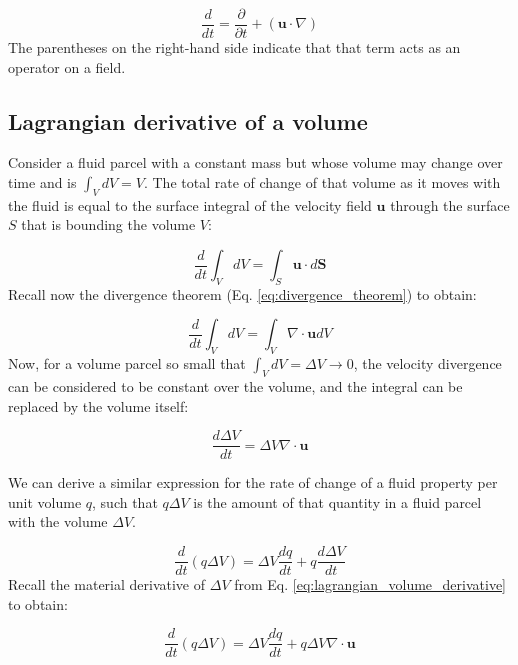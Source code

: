 \documentclass[12pt]{article}
\numberwithin{equation}{section}
\numberwithin{figure}{section}
\numberwithin{table}{section}
\begin{document}
\begin{equation}
  \frac{d}{dt} = \frac{\partial}{\partial t} + (\mathbf{u} \cdot \nabla)
\end{equation}
The parentheses on the right-hand side indicate that that term acts as an
operator on a field.

\subsection{Lagrangian derivative of a volume}

Consider a fluid parcel with a constant mass but whose volume may change over
time and is $\int_V dV = V$.
The total rate of change of that volume as it moves with the fluid is equal to
the surface integral of the velocity field $\mathbf{u}$ through the surface
$S$ that is bounding the volume $V$:

\begin{equation}
  \frac{d}{dt}\int_V dV = \int_S \mathbf{u} \cdot d\mathbf{S}
\end{equation}
Recall now the divergence theorem (Eq. \ref{eq:divergence_theorem}) to obtain:

\begin{equation}
  \frac{d}{dt}\int_V dV = \int_V \nabla \cdot \mathbf{u} dV
\end{equation}
Now, for a volume parcel so small that $\int_V dV = \Delta V \to 0$, the
velocity divergence can be considered to be constant over the volume, and the
integral can be replaced by the volume itself:

\begin{equation}
  \frac{d\Delta V}{dt} = \Delta V \nabla \cdot \mathbf{u}
  \label{eq:lagrangian_volume_derivative}
\end{equation}

We can derive a similar expression for the rate of change of a fluid property
per unit volume $q$, such that $q \Delta V$ is the amount of that quantity in
a fluid parcel with the volume $\Delta V$.

\begin{equation}
  \frac{d}{dt} (q \Delta V) = \Delta V \frac{dq}{dt} + q \frac{d\Delta V}{dt}
\end{equation}
Recall the material derivative of $\Delta V$ from Eq. \ref{eq:lagrangian_volume_derivative}
to obtain:

\begin{equation}
  \frac{d}{dt} (q \Delta V) = \Delta V \frac{dq}{dt} + q \Delta V \nabla \cdot \mathbf{u}
\end{equation}
\end{document}
